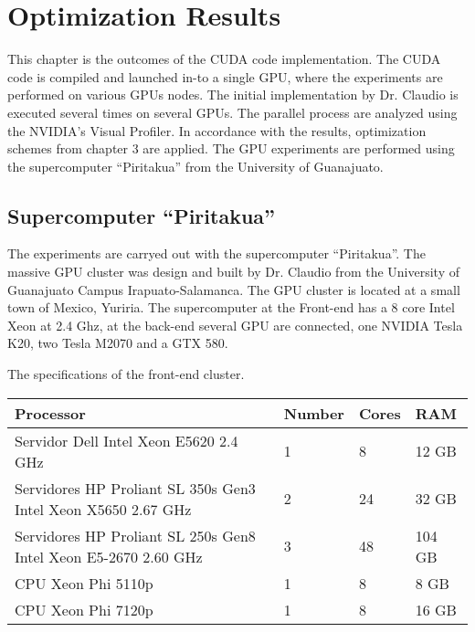 
\chapter{Optimization Results} %

\label{Optimization Results} %



This chapter is the outcomes of the CUDA code implementation. The CUDA code is compiled and launched in-to a single GPU, where the experiments are performed on various GPUs nodes. The initial implementation by Dr. Claudio is executed several times on several GPUs. The parallel process  are analyzed using the NVIDIA's Visual Profiler. In accordance with the results, optimization schemes from chapter 3 are applied. The GPU experiments are performed using the supercomputer ``Piritakua'' from the  University of Guanajuato.

\section{Supercomputer ``Piritakua''}

The experiments are  carryed out with the supercomputer “Piritakua”. The massive GPU cluster was design and built by Dr. Claudio from the University of Guanajuato Campus Irapuato-Salamanca. The GPU cluster is located at a small town of Mexico, Yuriria. The supercomputer at the Front-end has a 8 core Intel Xeon at 2.4 Ghz, at the back-end several GPU are connected, one NVIDIA Tesla K20, two Tesla M2070 and a GTX 580.

The specifications of the front-end cluster.

\begin{tabular}{ | p{7.1cm}  | l | l | l |}      
  \hline   
  Processor & Number & Cores & RAM  \\
  \hline
  Servidor Dell Intel Xeon E5620 2.4 GHz & 1 & 8 & 12 GB \\
  \hline
  Servidores HP Proliant SL 350s Gen3 Intel Xeon X5650 2.67 GHz & 2 & 24 & 32 GB \\
  \hline
   Servidores HP Proliant SL 250s Gen8 Intel Xeon E5-2670 2.60 GHz & 3 & 48 &104 GB \\
   \hline
   CPU Xeon Phi  5110p & 1 & 8 & 8 GB\\
   \hline
   CPU Xeon Phi 7120p  & 1 & 8 & 16 GB\\
   \hline
  \end{tabular}
  
